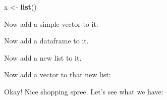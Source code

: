 \documentclass[]{book}
\newenvironment{Shaded}{\begin{snugshade}}{\end{snugshade}}
\newcommand{\DataTypeTok}[1]{\textcolor[rgb]{0.13,0.29,0.53}{#1}}
\newcommand{\DecValTok}[1]{\textcolor[rgb]{0.00,0.00,0.81}{#1}}
\newcommand{\KeywordTok}[1]{\textcolor[rgb]{0.13,0.29,0.53}{\textbf{#1}}}
\newcommand{\NormalTok}[1]{#1}
\newcommand{\OperatorTok}[1]{\textcolor[rgb]{0.81,0.36,0.00}{\textbf{#1}}}
\newcommand{\StringTok}[1]{\textcolor[rgb]{0.31,0.60,0.02}{#1}}
\begin{document}
\begin{Shaded}
\begin{Highlighting}[]
\NormalTok{x <-}\StringTok{ }\KeywordTok{list}\NormalTok{()}
\end{Highlighting}
\end{Shaded}

Now add a simple vector to it:

\begin{Shaded}
\end{Shaded}

Now add a dataframe to it.

\begin{Shaded}
\end{Shaded}

Now add a new list to it.

\begin{Shaded}
\end{Shaded}

Now add a vector to that new list:

\begin{Shaded}
\end{Shaded}

Okay! Nice shopping spree. Let's see what we have:
\end{document}
